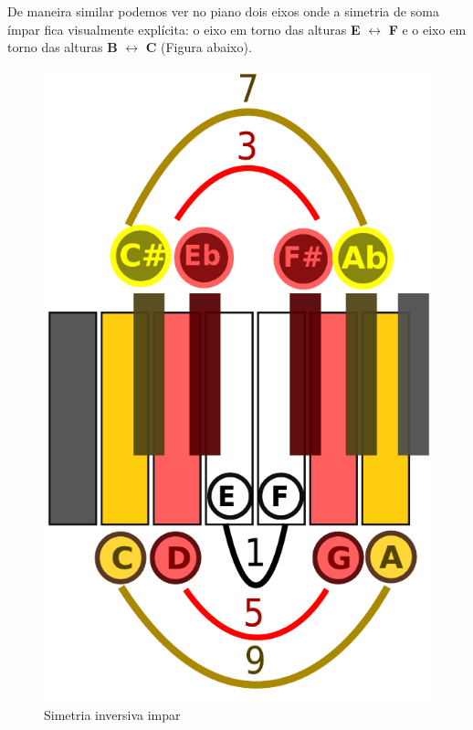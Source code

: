 \documentclass[
	12pt,				%
	openright,			%
	twoside,			%
	a4paper,			%
	english,			%
	french,				%
	spanish,			%
	brazil				%
	]{abntex2}
\begin{document}
De maneira similar podemos ver no piano dois eixos onde a simetria de soma ímpar fica visualmente explícita: o eixo em torno das alturas \textbf{E} $\leftrightarrow $  \textbf{F} e o eixo em torno das alturas \textbf{B} $\leftrightarrow $  \textbf{C}  (Figura abaixo).

\begin{figure}[!h]
	\caption{\label{fig_grafico}Simetria inversiva impar}
	\begin{center}
	    \includegraphics[scale=0.4]{axis/simetriainversiva_impar.pdf}
	\end{center}
\end{figure}
\end{document}
